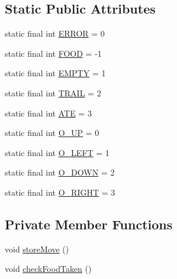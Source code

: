 \subsection*{Static Public Attributes}
\begin{DoxyCompactItemize}
\item 
static final int \hyperlink{classexamples_1_1gp_1_1anttrail_1_1_ant_map_af8255788ef3c81c9b6e31a5e1e2ff7a1}{E\-R\-R\-O\-R} = 0
\item 
static final int \hyperlink{classexamples_1_1gp_1_1anttrail_1_1_ant_map_abc79aa51bbaa3882872e9c83b6596f09}{F\-O\-O\-D} = -\/1
\item 
static final int \hyperlink{classexamples_1_1gp_1_1anttrail_1_1_ant_map_adc109e91c5e271d11e8777732e872d96}{E\-M\-P\-T\-Y} = 1
\item 
static final int \hyperlink{classexamples_1_1gp_1_1anttrail_1_1_ant_map_ab715ea00036e795c9b177f10127a0dda}{T\-R\-A\-I\-L} = 2
\item 
static final int \hyperlink{classexamples_1_1gp_1_1anttrail_1_1_ant_map_a05a7ff98925e4a8fdd57f374d4f6f562}{A\-T\-E} = 3
\item 
static final int \hyperlink{classexamples_1_1gp_1_1anttrail_1_1_ant_map_a17d359be48b28de3b154da7804ffbdff}{O\-\_\-\-U\-P} = 0
\item 
static final int \hyperlink{classexamples_1_1gp_1_1anttrail_1_1_ant_map_a406e10be0612f74b46ad6a59a1c0cb0b}{O\-\_\-\-L\-E\-F\-T} = 1
\item 
static final int \hyperlink{classexamples_1_1gp_1_1anttrail_1_1_ant_map_a91f09a31af79ae14af8fdce70d087b2d}{O\-\_\-\-D\-O\-W\-N} = 2
\item 
static final int \hyperlink{classexamples_1_1gp_1_1anttrail_1_1_ant_map_acd27da7ca68a3c85f50b98bbc76d2630}{O\-\_\-\-R\-I\-G\-H\-T} = 3
\end{DoxyCompactItemize}
\subsection*{Private Member Functions}
\begin{DoxyCompactItemize}
\item 
void \hyperlink{classexamples_1_1gp_1_1anttrail_1_1_ant_map_a85b60fccf8bc3cb7417fe81fcbd08062}{store\-Move} ()
\item 
void \hyperlink{classexamples_1_1gp_1_1anttrail_1_1_ant_map_aae11dd7ebb827880dd11c156a4732799}{check\-Food\-Taken} ()
\end{DoxyCompactItemize}
